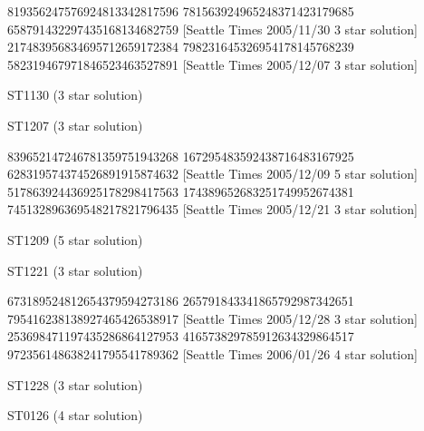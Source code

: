 \documentclass[twoside]{article}
\begin{document}
\renewcommand*{\puzzlefile}{st1130.ans}
\writepuzzle%
{819356247}{576924813}{342817596}%
{781563924}{965248371}{423179685}%
{658791432}{297435168}{134682759}
[Seattle Times 2005/11/30 3 star solution]
\renewcommand*{\puzzlefile}{st1207.ans}
\writepuzzle%
{217483956}{834695712}{659172384}%
{798231645}{326954178}{145768239}%
{582319467}{971846523}{463527891}%
[Seattle Times 2005/12/07 3 star solution]
\vfill
\noindent\begin{minipage}{0.47\linewidth}\begin{center}
ST1130 (3 star solution) \\
\end{center}\end{minipage}
\hfill
\begin{minipage}{0.47\linewidth}\begin{center}
ST1207 (3 star solution) \\
\end{center}\end{minipage}

\renewcommand*{\puzzlefile}{st1209.ans}
\writepuzzle%
{839652147}{246781359}{751943268}%
{167295483}{592438716}{483167925}%
{628319574}{374526891}{915874632}%
[Seattle Times 2005/12/09 5 star solution]
\renewcommand*{\puzzlefile}{st1221.ans}
\writepuzzle%
{517863924}{436925178}{298417563}%
{174389652}{683251749}{952674381}%
{745132896}{369548217}{821796435}%
[Seattle Times 2005/12/21 3 star solution]
\vfill
\noindent\begin{minipage}{0.47\linewidth}\begin{center}
ST1209 (5 star solution) \\
\end{center}\end{minipage}
\hfill
\begin{minipage}{0.47\linewidth}\begin{center}
ST1221 (3 star solution) \\
\end{center}\end{minipage}

\renewcommand*{\puzzlefile}{st1228.ans}
\writepuzzle%
{673189524}{812654379}{594273186}%
{265791843}{341865792}{987342651}%
{795416238}{138927465}{426538917}%
[Seattle Times 2005/12/28 3 star solution]
\renewcommand*{\puzzlefile}{st0126.ans}
\writepuzzle%
{253698471}{197435286}{864127953}%
{416573829}{785912634}{329864517}%
{972356148}{638241795}{541789362}%
[Seattle Times 2006/01/26 4 star solution]
\vfill
\noindent\begin{minipage}{0.47\linewidth}\begin{center}
ST1228 (3 star solution) \\
\end{center}\end{minipage}
\hfill
\begin{minipage}{0.47\linewidth}\begin{center}
ST0126 (4 star solution) \\
\end{center}\end{minipage}
\end{document}
